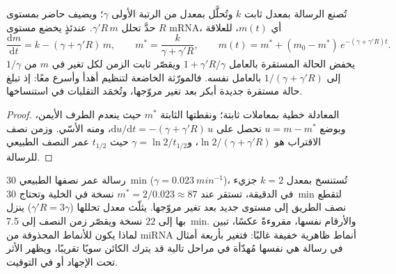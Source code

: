 \begin{theorem}\label{thm:b3:rna-regulation:mirna-kinetics}
تُصنع الرسالة بمعدل ثابت $k$ وتُحلَّل بمعدل من الرتبة الأولى $\gamma$؛
ويضيف  حاضر بمستوى $R$ حدَّ تحلل $\gamma' R\, m$. عندئذٍ
يخضع مستوى mRNA، أي $m(t)$، للعلاقة
\[
\frac{\mathrm{d}m}{\mathrm{d}t} = k - (\gamma + \gamma' R)\, m,
\qquad
m^{*} = \frac{k}{\gamma + \gamma' R},
\qquad
m(t) = m^{*} + (m_{0} - m^{*})\,e^{-(\gamma + \gamma' R)t}.
\]
يخفض  الحالة المستقرة بالعامل $1 + \gamma' R/
\gamma$ ويقصّر ثابت الزمن لكل تغير في $m$ من $1/\gamma$ إلى
$1/(\gamma + \gamma' R)$ بالعامل نفسه. فالمورّثة الخاضعة لتنظيم 
أهدأ وأسرع معًا: إذ تبلغ حالة مستقرة جديدة أبكر بعد تغير مروّجها،
وتُخمَد التقلبات في استنساخها.
\end{theorem}
\begin{proof}
المعادلة خطية بمعاملات ثابتة؛ ونقطتها الثابتة $m^{*}$ حيث ينعدم الطرف
الأيمن، وبوضع $u = m - m^{*}$ نحصل على
$\mathrm{d}u/\mathrm{d}t = -(\gamma + \gamma' R)\,u$، ومنه الأسّي.
وزمن نصف الاقتراب هو $\ln 2/(\gamma + \gamma'
R)$، و$\gamma = \ln 2 / t_{1/2}$ حيث $t_{1/2}$ عمر النصف الطبيعي
للرسالة.
\end{proof}

\begin{example}\label{ex:b3:rna-regulation:fourfold}
رسالة عمر نصفها الطبيعي \qty{30}{min} ($\gamma =
\qty{0.023}{min^{-1}}$)، تُستنسخ بمعدل $k = 2$ جزيء في الدقيقة، تستقر
عند $m^{*} = 2/0.023 \approx 87$ نسخة في الخلية وتحتاج
\qty{30}{min} لتقطع نصف الطريق إلى مستوى جديد بعد تغير مروّجها.  يثلّث معدل تحللها ($\gamma' R = 3\gamma$) ينزل بها إلى $22$
نسخة ويقصّر زمن النصف إلى \qty{7.5}{min}. والأرقام نفسها، مقروءةً
عكسًا، تبين لماذا يكون للأنماط المحذوفة من miRNA أنماط ظاهرية خفيفة
غالبًا: فتغير بأربعة أمثال في رسالة هي نفسها مُهدّأة في مراحل تالية
قد يترك الكائن سويًا تقريبًا، ويظهر الأثر تحت الإجهاد أو في التوقيت.
\end{example}

